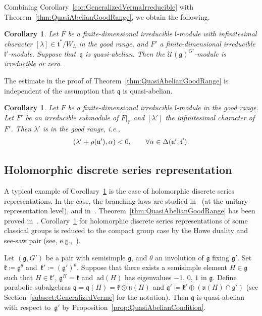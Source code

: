 \documentclass[10pt,a4paper]{amsart}
\numberwithin{equation}{section}
\newtheorem{Corollary}[Theorem]{Corollary}
\theoremstyle{definition}
\newcommand{\Hom}{\mathrm{Hom}}
\newcommand{\ad}{\mathrm{ad}}
\newcommand{\lieC}[1]{\mathfrak{#1}}
\newcommand{\lie}[1]{\mathfrak{#1}}
\newcommand{\univ}[1]{\mathcal{U}(\lieC{#1})}
\newcommand{\ind}[2]{\mathrm{ind}^{\lieC{#1}}_{\lieC{#2}}}
\let\Re\relax
\DeclareMathOperator{\Re}{\mathrm{Re}}
\newcommand{\rhog}[1]{\rho(#1)}
\begin{document}
Combining Corollary~\ref{cor:GeneralizedVermaIrreducible} with Theorem~\ref{thm:QuasiAbelianGoodRange}, we obtain the following.

\begin{Corollary}\label{cor:IrreducibleVermaQuasiAbelian}
	Let $F$ be a finite-dimensional irreducible $\lie{l}$-module with infinitesimal character $[\lambda] \in \lie{t}^*/W_L$
	in the good range, and $F'$ a finite-dimensional irreducible $\lie{l}'$-module.
	Suppose that~$\lie{q}$ is quasi-abelian.
	Then the $\univ{g}^{G'}$-module \smash{$\Hom_{\lie{g'}}\bigl(\ind{g'}{q'}(F'), \ind{g}{q}(F)\bigr)$} is irreducible or zero.
\end{Corollary}

The estimate in the proof of Theorem~\ref{thm:QuasiAbelianGoodRange} is independent of the assumption that $\lie{q}$ is quasi-abelian.

\begin{Corollary}%
	Let $F$ be a finite-dimensional irreducible $\lie{l}$-module in the good range.
	Let $F'$ be an irreducible submodule of $F|_{\lie{l}'}$ and $[\lambda']$ the infinitesimal character of $F'$.
	Then $\lambda'$ is in the good range, i.e.,
	\begin{align*}
		\Re(\lambda'+\rhog{\lie{u}'}, \alpha) < 0, \qquad \forall \alpha \in \Delta(\lie{u'}, \lie{t'}).
	\end{align*}
\end{Corollary}

\subsection{Holomorphic discrete series representation}

A typical example of Corollary~\ref{cor:IrreducibleVermaQuasiAbelian} is the case of holomorphic discrete series representations.
In the case, the branching laws are studied in~\cite{JaVe79} (at the unitary representation level),
and in~\mbox{\cite{Ko98,Ko08}}.
Theorem~\ref{thm:QuasiAbelianGoodRange} has been proved in~\cite[Theorem~7.4]{Ko98}.
Corollary~\ref{cor:IrreducibleVermaQuasiAbelian} for holomorphic discrete series representations of some classical groups is reduced to the compact group case by the Howe duality and see-saw pair (see, e.g.,~\cite[Lemma~2.6]{Ma16_dual_pair}).

Let $(\lie{g}, G')$ be a pair with semisimple $\lie{g}$,
and $\theta$ an involution of $\lie{g}$ fixing $\lie{g'}$.
Set $\lie{k}\coloneq \lie{g}^\theta$ and~$\lie{k'}\coloneq (\lie{g'})^\theta$.
Suppose that there exists a semisimple element $H \in \lie{g}$ such that
$H \in \lie{k'}$, $\lie{g}^H = \lie{k}$ and~$\ad(H)$ has eigenvalues $-1$, $0$, $1$ in $\lie{g}$.
Define parabolic subalgebras $\lie{q} = \lie{q}(H) = \lie{k} \oplus \lie{u}(H)$
and $\lie{q'} \coloneq \lie{k}'\oplus (\lie{u}(H)\cap \lie{g'})$ (see Section~\ref{subsect:GeneralizedVerme} for the notation).
Then $\lie{q}$ is quasi-abelian with respect to~$\lie{g'}$ by Proposition~\ref{prop:QuasiAbelianCondition}.
\end{document}
